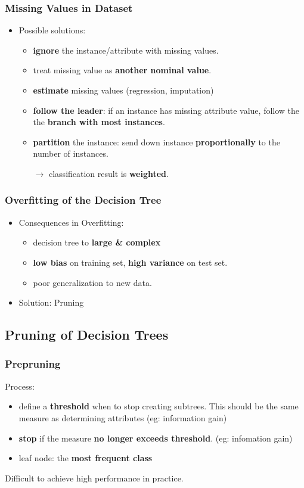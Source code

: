 \subsubsection{Missing Values in Dataset}
\begin{itemize}
	\item Possible solutions:
	\begin{itemize}
		\item \textbf{ignore} the instance/attribute with missing values.
		\item treat missing value as \textbf{another nominal value}.
		\item \textbf{estimate} missing values (regression, imputation)
		\item \textbf{follow the leader}: if an instance has missing attribute value, follow the the \textbf{branch with most instances}.
		\item \textbf{partition} the instance: send down instance \textbf{proportionally} to the number of instances. 
		
		$\rightarrow$ classification result is \textbf{weighted}.
	\end{itemize}
\end{itemize}

\subsubsection{Overfitting of the Decision Tree}
\begin{itemize}
	\item Consequences in Overfitting:
	\begin{itemize}
		\item decision tree to \textbf{large \& complex}
		\item \textbf{low bias} on training set, \textbf{high variance} on test set.
		\item poor generalization to new data.
	\end{itemize}
	\item Solution: Pruning 
\end{itemize}

\subsection{Pruning of Decision Trees}
\subsubsection{Prepruning}
Process:
\begin{itemize}
	\item define a \textbf{threshold} when to stop creating subtrees. This should be the same measure as determining attributes (eg: information gain)
	\item \textbf{stop} if the measure \textbf{no longer exceeds threshold}. (eg: infomation gain)
	\item leaf node: the \textbf{most frequent class}
\end{itemize}
Difficult to achieve high performance in practice.

